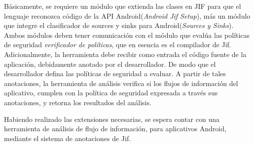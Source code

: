 Básicamente, se requiere un módulo que extienda las clases en JIF para que el
lenguaje reconozca código de la API Android(\emph{Android Jif Setup}), más un
módulo que integre el clasificador de sources y sinks para Android(\emph{Sources
y Sinks}). 
Ambos módulos deben tener comunicación con el módulo que evalúa las
políticas de seguridad \emph{verificador de políticas}, que en esencia es el
compilador de Jif.\newline
Adicionalmente, la herramienta
debe recibir como entrada el código fuente de la aplicación, debidamente
anotado por el desarrollador. De modo que el desarrollador defina las políticas
de seguridad a evaluar. A partir de tales anotaciones, la herramienta de
análisis verifica si los flujos de información del aplicativo, cumplen con la
política de seguridad expresada a través sus anotaciones, y retorna los
resultados del análisis.

Habiendo realizado las extensiones necesarias, se espera contar
con una herramienta de análisis de flujo de información, para aplicativos Android,
mediante el sistema de anotaciones de Jif.



